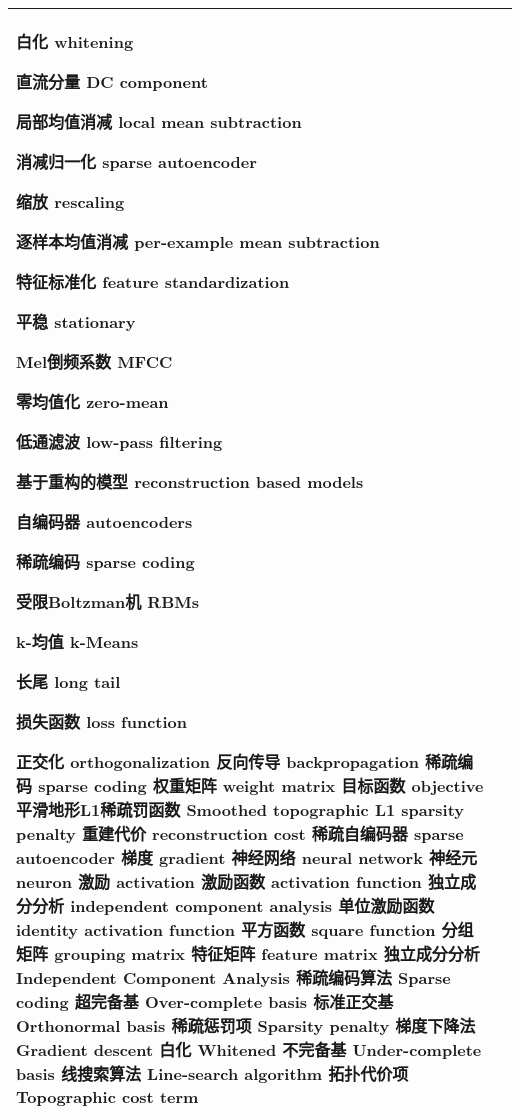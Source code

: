 \begin{longtable}[h]{m{}m{}}
    白化 whitening 

    直流分量 DC component 

    局部均值消减 local mean subtraction 

    消减归一化 sparse autoencoder 

    缩放 rescaling 

    逐样本均值消减 per-example mean subtraction 

    特征标准化 feature standardization 

    平稳 stationary 

    Mel倒频系数 MFCC 

    零均值化 zero-mean 

    低通滤波 low-pass filtering 

    基于重构的模型 reconstruction based models 

    自编码器 autoencoders 

    稀疏编码 sparse coding 

    受限Boltzman机 RBMs 

    k-均值 k-Means 

    长尾 long tail 

    损失函数 loss function 

    正交化 orthogonalization
    反向传导 backpropagation 
    稀疏编码 sparse coding 
    权重矩阵 weight matrix 
    目标函数 objective 
    平滑地形L1稀疏罚函数 Smoothed topographic L1 sparsity penalty 
    重建代价 reconstruction cost 
    稀疏自编码器 sparse autoencoder 
    梯度 gradient 
    神经网络 neural network 
    神经元 neuron 
    激励 activation 
    激励函数 activation function 
    独立成分分析 independent component analysis 
    单位激励函数 identity activation function 
    平方函数 square function 
    分组矩阵 grouping matrix 
    特征矩阵 feature matrix 
    独立成分分析 Independent Component Analysis 
    稀疏编码算法 Sparse coding 
    超完备基 Over-complete basis 
    标准正交基 Orthonormal basis 
    稀疏惩罚项 Sparsity penalty 
    梯度下降法 Gradient descent 
    白化 Whitened 
    不完备基 Under-complete basis 
    线搜索算法 Line-search algorithm 
    拓扑代价项 Topographic cost term 
\\

\bottomrule
\end{longtable}

\subsection{}


